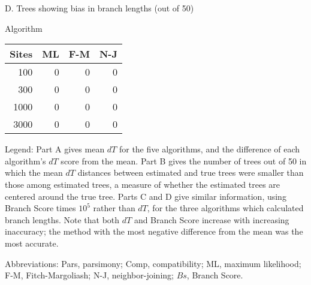 \begin{flushleft}
\begin{center}
\bigskip

D. Trees showing bias in branch lengths (out of 50)

Algorithm

\begin{tabular}{| r | r r r |}
\hline
Sites  & ML & F-M & N-J\\
\hline
100  & 0 & 0 & 0\\
300  & 0 & 0 & 0\\
1000  & 0 & 0 & 0\\
3000  & 0 & 0 & 0\\
\hline
\end{tabular}
\end{center}

\end{flushleft}

{\sc Legend:}  Part A gives mean $dT$ for the five algorithms, and the
difference of each algorithm's $dT$ score from the mean.  Part B gives the
number of trees out of 50 in which the mean $dT$ distances between
estimated and true trees were smaller than those among estimated trees,
a measure of whether the estimated trees are centered around the true
tree.  Parts C and D give similar information,
using Branch Score times $10^5$ rather than $dT$, for the three algorithms 
which calculated branch lengths.  Note that both $dT$ and Branch Score
increase with increasing inaccuracy; the method with the most
negative difference from the mean was the most accurate.

{\sc Abbreviations: }  Pars, parsimony; Comp, compatibility; ML, maximum
likelihood; F-M, Fitch-Margoliash; N-J, neighbor-joining; $Bs$, Branch
Score.
\newpage

